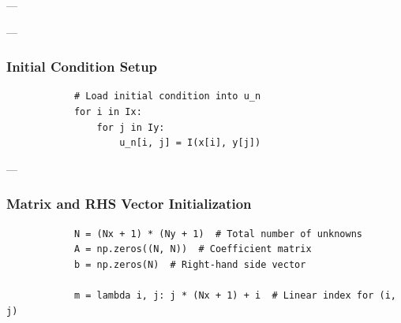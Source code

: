 \documentclass{article}
\begin{document}
		---

		---
		
		\subsubsection{Initial Condition Setup}
		\begin{lstlisting}
			# Load initial condition into u_n
			for i in Ix:
				for j in Iy:
					u_n[i, j] = I(x[i], y[j])
		\end{lstlisting}
		
		\noindent

		---
		
		\subsubsection{Matrix and RHS Vector Initialization}
		\begin{lstlisting}
			N = (Nx + 1) * (Ny + 1)  # Total number of unknowns
			A = np.zeros((N, N))  # Coefficient matrix
			b = np.zeros(N)  # Right-hand side vector
			
			m = lambda i, j: j * (Nx + 1) + i  # Linear index for (i, j)
		\end{lstlisting}
		
\end{document}
